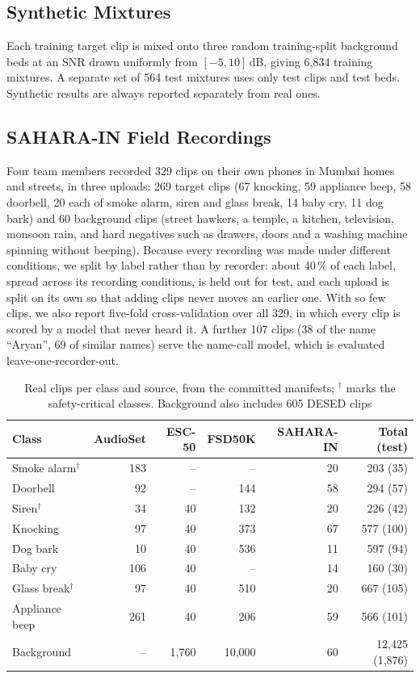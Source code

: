 \documentclass{svproc}
\begin{document}
\subsection{Synthetic Mixtures}
Each training target clip is mixed onto three random training-split background beds at an SNR drawn uniformly from $[-5, 10]$\,dB, giving 6,834 training mixtures. A separate set of 564 test mixtures uses only test clips and test beds. Synthetic results are always reported separately from real ones.

\subsection{SAHARA-IN Field Recordings}
Four team members recorded 329 clips on their own phones in Mumbai homes and streets, in three uploads: 269 target clips (67 knocking, 59 appliance beep, 58 doorbell, 20 each of smoke alarm, siren and glass break, 14 baby cry, 11 dog bark) and 60 background clips (street hawkers, a temple, a kitchen, television, monsoon rain, and hard negatives such as drawers, doors and a washing machine spinning without beeping). Because every recording was made under different conditions, we split by label rather than by recorder: about 40\,\% of each label, spread across its recording conditions, is held out for test, and each upload is split on its own so that adding clips never moves an earlier one. With so few clips, we also report five-fold cross-validation over all 329, in which every clip is scored by a model that never heard it. A further 107 clips (38 of the name ``Aryan'', 69 of similar names) serve the name-call model, which is evaluated leave-one-recorder-out.

\begin{table}[t]
\caption{Real clips per class and source, from the committed manifests; $^\dagger$ marks the safety-critical classes. Background also includes 605 DESED clips}
\label{tab:data}
\centering
\begin{tabular}{@{}lrrrrr@{}}
\toprule
Class & AudioSet & ESC-50 & FSD50K & SAHARA-IN & Total (test) \\
\midrule
Smoke alarm$^\dagger$ & 183 & -- & -- & 20 & 203 (35) \\
Doorbell & 92 & -- & 144 & 58 & 294 (57) \\
Siren$^\dagger$ & 34 & 40 & 132 & 20 & 226 (42) \\
Knocking & 97 & 40 & 373 & 67 & 577 (100) \\
Dog bark & 10 & 40 & 536 & 11 & 597 (94) \\
Baby cry & 106 & 40 & -- & 14 & 160 (30) \\
Glass break$^\dagger$ & 97 & 40 & 510 & 20 & 667 (105) \\
Appliance beep & 261 & 40 & 206 & 59 & 566 (101) \\
Background & -- & 1,760 & 10,000 & 60 & 12,425 (1,876) \\
\bottomrule
\end{tabular}
\end{table}
\end{document}
